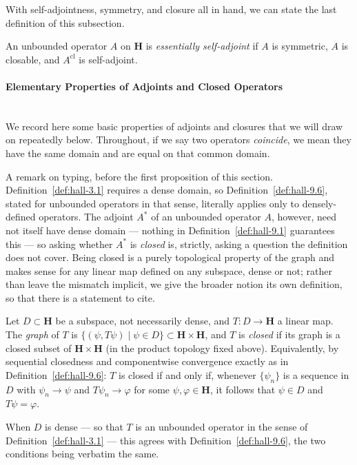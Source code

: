 With self-adjointness, symmetry, and closure all in hand, we can state the last definition of this subsection.

\begin{definition}
    \label{def:hall-9.7}
    \leanok
    An unbounded operator $A$ on $\mathbf{H}$ is \textit{essentially self-adjoint} if $A$ is symmetric, $A$ is closable, and $A^{\text{cl}}$ is self-adjoint.
\end{definition}

\paragraph{Elementary Properties of Adjoints and Closed Operators}\mbox{}\\
We record here some basic properties of adjoints and closures that we will draw on repeatedly below. Throughout, if we say two operators \textit{coincide}, we mean they have the same domain and are equal on that common domain.

A remark on typing, before the first proposition of this section. Definition~\ref{def:hall-3.1} requires a dense domain, so Definition~\ref{def:hall-9.6}, stated for unbounded operators in that sense, literally applies only to densely-defined operators. The adjoint $A^*$ of an unbounded operator $A$, however, need not itself have dense domain — nothing in Definition~\ref{def:hall-9.1} guarantees this — so asking whether $A^*$ is \textit{closed} is, strictly, asking a question the definition does not cover. Being closed is a purely topological property of the graph and makes sense for any linear map defined on any subspace, dense or not; rather than leave the mismatch implicit, we give the broader notion its own definition, so that there is a statement to cite.

\begin{definition}
    \label{def:closed-linear-map-on-a-subspace}
    \leanok
    Let $D \subset \mathbf{H}$ be a subspace, not necessarily dense, and $T : D \to \mathbf{H}$ a linear map. The \textit{graph} of $T$ is $\{ (\psi, T\psi) \mid \psi \in D \} \subset \mathbf{H} \times \mathbf{H}$, and $T$ is \textit{closed} if its graph is a closed subset of $\mathbf{H} \times \mathbf{H}$ (in the product topology fixed above). Equivalently, by sequential closedness and componentwise convergence exactly as in Definition~\ref{def:hall-9.6}: $T$ is closed if and only if, whenever $\{\psi_n\}$ is a sequence in $D$ with $\psi_n \to \psi$ and $T\psi_n \to \varphi$ for some $\psi,\varphi \in \mathbf{H}$, it follows that $\psi \in D$ and $T\psi = \varphi$.

    When $D$ is dense — so that $T$ is an unbounded operator in the sense of Definition~\ref{def:hall-3.1} — this agrees with Definition~\ref{def:hall-9.6}, the two conditions being verbatim the same.
\end{definition}

